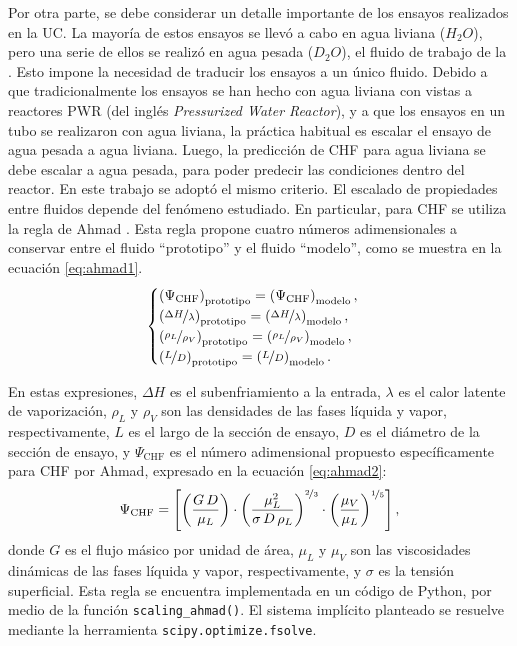 Por otra parte, se debe considerar un detalle importante de los ensayos realizados en la UC. La mayoría de estos ensayos se llevó a cabo en agua liviana ($H_2 O$), pero una serie de ellos se realizó en agua pesada ($D_2 O$), el fluido de trabajo de la \cna{}. Esto impone la necesidad de traducir los ensayos a un único fluido. Debido a que tradicionalmente los ensayos se han hecho con agua liviana con vistas a reactores PWR (del inglés \textit{Pressurized Water Reactor}), y a que los ensayos en un tubo se realizaron con agua liviana, la práctica habitual es escalar el ensayo de agua pesada a agua liviana. Luego, la predicción de CHF para agua liviana se debe escalar a agua pesada, para poder predecir las condiciones dentro del reactor. En este trabajo se adoptó el mismo criterio. El escalado de propiedades entre fluidos depende del fenómeno estudiado. En particular, para CHF se utiliza la regla de Ahmad \citep{ahmad1973}. Esta regla propone cuatro números adimensionales a conservar entre el fluido ``prototipo'' y el fluido ``modelo'', como se muestra en la ecuación \ref{eq:ahmad1}.
\begin{equation}
    \label{eq:ahmad1}
    \begin{cases}
        \left( \Psi_\mathrm{CHF} \right)_\mathrm{prototipo} = \left( \Psi_\mathrm{CHF} \right)_\mathrm{modelo}, \\
        \left( \nicefrac{\Delta H}{\lambda} \right)_\mathrm{prototipo} = \left( \nicefrac{\Delta H}{\lambda} \right)_\mathrm{modelo}, \\ 
        \left( \nicefrac{\rho_L}{\rho_V} \right)_\mathrm{prototipo} = \left( \nicefrac{\rho_L}{\rho_V} \right)_\mathrm{modelo}, \\ 
        \left( \nicefrac{L}{D} \right)_\mathrm{prototipo} = \left( \nicefrac{L}{D} \right)_\mathrm{modelo}.
    \end{cases}
\end{equation}

En estas expresiones, $\Delta H$ es el subenfriamiento a la entrada, $\lambda$ es el calor latente de vaporización, $\rho_L$ y $\rho_V$ son las densidades de las fases líquida y vapor, respectivamente, $L$ es el largo de la sección de ensayo, $D$ es el diámetro de la sección de ensayo, y $\Psi_\mathrm{CHF}$ es el número adimensional propuesto específicamente para CHF por Ahmad, expresado en la ecuación \ref{eq:ahmad2}:
\begin{equation}
    \label{eq:ahmad2}
    \Psi_\mathrm{CHF} = \left[\left(\frac{G\,D}{\mu_L}\right) \cdot \left(\frac{\mu_L^2}{\sigma\,D\,\rho_L}\right)^{\nicefrac{2}{3}} \cdot \left(\frac{\mu_V}{\mu_L}\right)^{\nicefrac{1}{5}} \right],
\end{equation}
donde $G$ es el flujo másico por unidad de área, $\mu_L$ y $\mu_V$ son las viscosidades dinámicas de las fases líquida y vapor, respectivamente, y $\sigma$ es la tensión superficial. Esta regla se encuentra implementada en un código de Python, por medio de la función \texttt{scaling\_ahmad()}. El sistema implícito planteado se resuelve mediante la herramienta \texttt{scipy.optimize.fsolve}.

